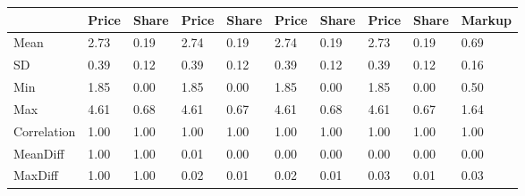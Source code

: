 \begin{table}[htbp]
\begin{tabular}{llllllllll} \hline \hline
 & Price  & Share  & Price  & Share  & Price  & Share  & Price  & Share  & Markup  \\  \hline 
Mean &      2.73 &      0.19 &      2.74 &      0.19 &      2.74 &      0.19 &      2.73 &      0.19 &      0.69 \\  
SD &      0.39 &      0.12 &      0.39 &      0.12 &      0.39 &      0.12 &      0.39 &      0.12 &      0.16 \\  
Min &      1.85 &      0.00 &      1.85 &      0.00 &      1.85 &      0.00 &      1.85 &      0.00 &      0.50 \\  
Max &      4.61 &      0.68 &      4.61 &      0.67 &      4.61 &      0.68 &      4.61 &      0.67 &      1.64 \\  
Correlation &      1.00 &      1.00 &      1.00 &      1.00 &      1.00 &      1.00 &      1.00 &      1.00 &      1.00 \\  
MeanDiff &      1.00 &      1.00 &      0.01 &      0.00 &      0.00 &      0.00 &      0.00 &      0.00 &      0.00 \\  
MaxDiff &      1.00 &      1.00 &      0.02 &      0.01 &      0.02 &      0.01 &      0.03 &      0.01 &      0.03 \\  
\hline \hline \end{tabular}
\end{table}
